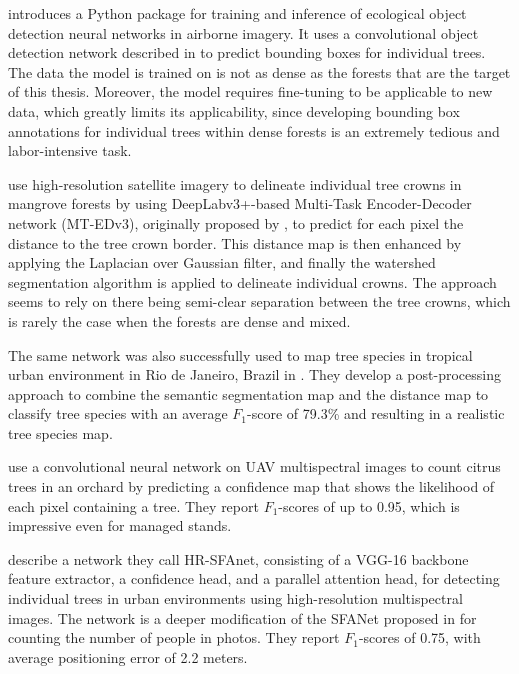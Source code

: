 \citet{weinsteinDeepForestPythonPackage2020} introduces a Python package for training and inference of ecological object detection neural networks in airborne imagery.
It uses a convolutional object detection network described in \citet{weinsteinIndividualTreeCrownDetection2019} to predict bounding boxes for individual trees.
The data the model is trained on is not as dense as the forests that are the target of this thesis.
Moreover, the model requires fine-tuning to be applicable to new data, which greatly limits its applicability, since developing bounding box annotations for individual trees within dense forests is an extremely tedious and labor-intensive task.

\citet{lassalleDeepLearningbasedIndividual2022} use high-resolution satellite imagery to delineate individual tree crowns in mangrove forests by using DeepLabv3+-based Multi-Task Encoder-Decoder network (MT-EDv3), originally proposed by \citet{larosaMultitaskFullyConvolutional2021}, to predict for each pixel the distance to the tree crown border.
This distance map is then enhanced by applying the Laplacian over Gaussian filter, and finally the watershed segmentation algorithm is applied to delineate individual crowns.
The approach seems to rely on there being semi-clear separation between the tree crowns, which is rarely the case when the forests are dense and mixed.

The same network was also successfully used to map tree species in tropical urban environment in Rio de Janeiro, Brazil in \citet{martinsDeepLearningbasedTree2021}.
They develop a post-processing approach to combine the semantic segmentation map and the distance map to classify tree species with an average $F_1$-score of 79.3\% and resulting in a realistic tree species map.

\citet{oscoConvolutionalNeuralNetwork2020} use a convolutional neural network on UAV multispectral images to count citrus trees in an orchard by predicting a confidence map that shows the likelihood of each pixel containing a tree.
They report $F_1$-scores of up to 0.95, which is impressive even for managed stands.

\citet{venturaIndividualTreeDetection2024} describe a network they call HR-SFAnet, consisting of a VGG-16 \citep{simonyanVeryDeepConvolutional2014} backbone feature extractor, a confidence head, and a parallel attention head, for detecting individual trees in urban environments using high-resolution multispectral images.
The network is a deeper modification of the SFANet proposed in \citet{zhuDualPathMultiScale2019} for counting the number of people in photos.
They report $F_1$-scores of 0.75, with average positioning error of 2.2 meters.


